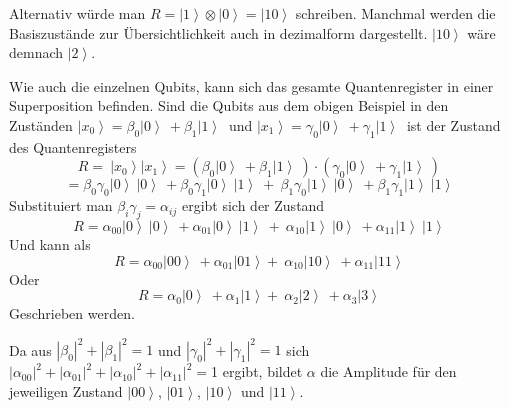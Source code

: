 Alternativ würde man $R=\left|1\right\rangle\otimes\left|0\right\rangle=\left|10\right\rangle$ schreiben. Manchmal werden die Basiszustände zur Übersichtlichkeit auch in dezimalform dargestellt. $\left|10\right\rangle$ wäre demnach $\left|2\right\rangle$. 

Wie auch die einzelnen Qubits, kann sich das gesamte Quantenregister in einer Superposition befinden. Sind die Qubits aus dem obigen Beispiel in den Zuständen 
$\left|\left.x_0\right\rangle\right.=\beta_0\left|\left.0\right\rangle\ \right.+\beta_1\left|\left.1\right\rangle\ \right.$ und $\left.\left|\left.x_1\right\rangle\right.=\gamma_0\left|\left.0\right\rangle\ \right.+\gamma_1\left|\left.1\right\rangle\ \right.\right.$
ist der Zustand des Quantenregisters 
$$R=\ \left|\left.x_0\right\rangle\right.\left|\left.x_1\right\rangle\right.=\left(\beta_0\left|\left.0\right\rangle\ \right.+\beta_1\left|\left.1\right\rangle\ \right.\right)\cdot(\gamma_0\left|\left.0\right\rangle\ \right.+\gamma_1\left|\left.1\right\rangle\ \right.)\ $$
$$=\beta_0\gamma_0\left|\left.0\right\rangle\ \right.\left|\left.0\right\rangle\ \right.+\beta_0\gamma_1\left|\left.0\right\rangle\ \left|\left.1\right\rangle\ \right.\right.+\ \beta_1\gamma_0\left|\left.1\right\rangle\ \right.\left|\left.0\right\rangle\ \right.+\beta_1\gamma_1\left|\left.1\right\rangle\ \right.\left|\left.1\right\rangle\ \right.$$
Substituiert man $\beta_i\gamma_j=\alpha_{ij}$ ergibt sich der Zustand
$$R=\alpha_{00}\left|\left.0\right\rangle\ \right.\left|\left.0\right\rangle\ \right.+\alpha_{01}\left|\left.0\right\rangle\ \left|\left.1\right\rangle\ \right.\right.+\ \alpha_{10}\left|\left.1\right\rangle\ \right.\left|\left.0\right\rangle\ \right.+\alpha_{11}\left|\left.1\right\rangle\ \right.\left|\left.1\right\rangle\ \right.$$
Und kann als
$$R=\alpha_{00}\left|\left.00\right\rangle\ \right.+\alpha_{01}\left|\left.01\right\rangle\right.+\ \alpha_{10}\left|\left.10\right\rangle\ \right.+\alpha_{11}\left|\left.11\right\rangle\ \right.$$
Oder
$$R=\alpha_0\left|\left.0\right\rangle\ \right.+\alpha_1\left|\left.1\right\rangle\right.+\ \alpha_2\left|\left.2\right\rangle\ \right.+\alpha_3\left|\left.3\right\rangle\ \right.$$
Geschrieben werden.

Da aus $\left|\beta_0\right|^2+\left|\beta_1\right|^2=1$ und $\left|\gamma_0\right|^2+\left|\gamma_1\right|^2=1$ sich $\left|\alpha_{00}\right|^2+\left|\alpha_{01}\right|^2+\left|\alpha_{10}\right|^2+\left|\alpha_{11}\right|^2=$1 ergibt, bildet $\alpha$ die Amplitude für den jeweiligen Zustand $\left|\left.00\right\rangle\right.$, $\left|\left.01\right\rangle\right.$, $\left|\left.10\right\rangle\right.$ und $\left|\left.11\right\rangle\right.$. 

